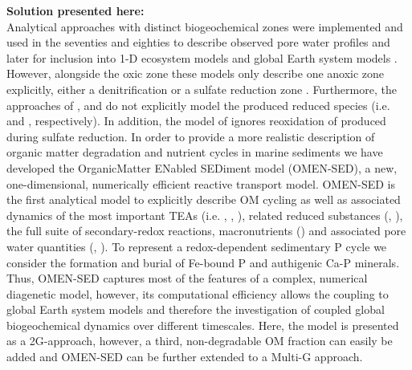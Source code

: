 \documentclass[gmd, manuscript]{copernicus}
\begin{document}
\textbf{Solution presented here:}\\
Analytical approaches with distinct biogeochemical zones were implemented and used in the seventies and eighties to describe observed pore water profiles 
\citep[e.g.][]{vanderborght_vertical_1975, vanderborght_kinetic_1977, billen1982idealized, goloway_diagenetic_1982} and later for inclusion into 1-D ecosystem models \citep[e.g.][]{ruardij_benthic_1995} and 
global Earth system models \citep{tromp_global_1995}. 
However, alongside the oxic zone these models only describe one anoxic zone explicitly, either a denitrification \citep{vanderborght_vertical_1975, vanderborght_kinetic_1977, billen1982idealized, goloway_diagenetic_1982, ruardij_benthic_1995} 
or a sulfate reduction zone \citep{tromp_global_1995}. 
Furthermore, the approaches of \citet{vanderborght_vertical_1975}, \citet{goloway_diagenetic_1982} and \citet{tromp_global_1995} do not explicitly model the produced reduced 
species (i.e.  and , respectively). In addition, the model of \citet{tromp_global_1995} ignores reoxidation of  produced during sulfate reduction. 
In order to provide a more realistic description of organic matter degradation and nutrient cycles in marine sediments we have developed the OrganicMatter ENabled SEDiment model (OMEN-SED), 
a new, one-dimensional, numerically efficient reactive transport model. OMEN-SED is the first analytical model to explicitly describe OM cycling as well as associated dynamics of the most important TEAs 
(i.e. , , ), related reduced substances (, ), the full suite of secondary-redox reactions, macronutrients () and associated pore water quantities (, ). 
To represent a redox-dependent sedimentary P cycle we consider the formation and burial of Fe-bound P and authigenic Ca-P minerals. %
Thus, OMEN-SED captures most of the features of a complex, numerical diagenetic model, however, its computational efficiency allows the coupling to global Earth system models and therefore the investigation of coupled global biogeochemical 
dynamics over different timescales. 
Here, the model is presented as a 2G-approach, however, a third, non-degradable OM fraction can easily be added and OMEN-SED can be further extended to a Multi-G approach. 
\end{document}
